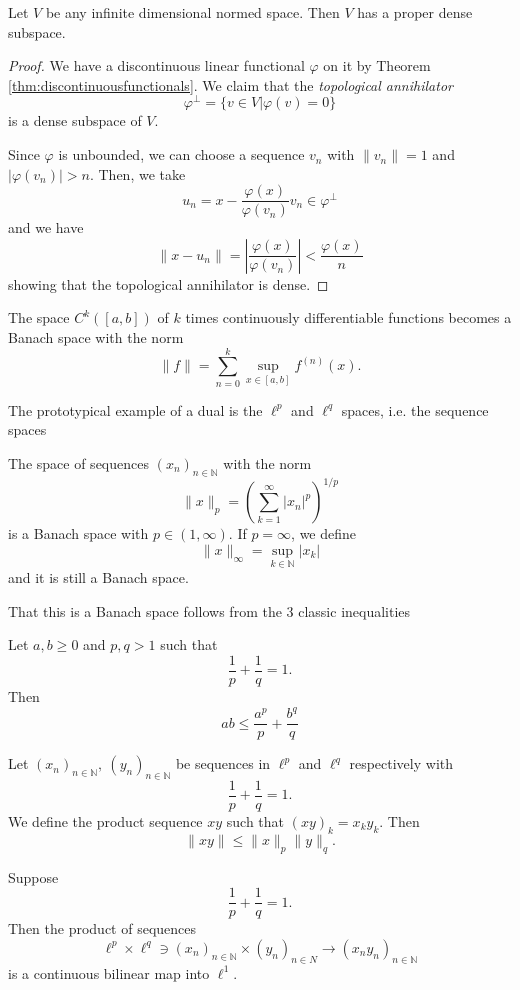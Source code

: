 \documentclass[twoside,symmetric, openany, 12pt]{./tuftebook}
\theoremstyle{definition}
\theoremstyle{definition}
\theoremstyle{definition}
\newcommand{\N}{\mathbb{N}}
\begin{document}
\begin{Example}
	Let $V$ be any infinite dimensional normed space. Then $V$ has a proper dense subspace.
\end{Example}
\begin{proof}
	We have a discontinuous linear functional $\varphi$ on it by Theorem \ref{thm:discontinuousfunctionals}. We claim that the \emph{topological annihilator}
	\[\varphi^\perp = \{v\in V|\varphi(v) = 0\}\]
	is a dense subspace of $V$.
	
	Since $\varphi$ is unbounded, we can choose a sequence $v_n$ with $\|v_n\| = 1$ and $|\varphi(v_n)| > n$. Then, we take
	\[u_n = x - \frac{\varphi(x)}{\varphi(v_n)}v_n\in \varphi^\perp\]
	and we have
	\[\|x - u_n\| = \left|\frac{\varphi(x)}{\varphi(v_n)}\right|< \frac{\varphi(x)}{n}\]
	showing that the topological annihilator is dense.
\end{proof}
\begin{Example}
	The space $C^k([a,b])$ of $k$ times continuously differentiable functions becomes a Banach space with the norm
	\[\|f\| = \sum_{n=0}^k \sup_{x\in [a,b]} f^{(n)}(x).\]
\end{Example}
The prototypical example of a dual is the $\ell^p$ and $\ell^q$ spaces, i.e. the sequence spaces
\begin{Definition}[$\ell^p$]
	The space of sequences $(x_n)_{n\in \N}$ with the norm
	\[\|x\|_p = \left(\sum_{k=1}^\infty |x_n|^p\right)^{1/p}\]
	is a Banach space with $p\in (1,\infty)$. If $p=\infty$, we define
	\[\|x\|_\infty = \sup_{k\in \N} |x_k|\]
	and it is still a Banach space.
\end{Definition}
That this is a Banach space follows from the 3 classic inequalities
\begin{Theorem}
	Let $a,b\ge 0$ and $p,q>1$ such that
	\[\frac 1p + \frac 1q = 1.\]
	Then
	\[ab \le \frac{a^p}{p}+ \frac{b^q}{q}\]
\end{Theorem}
\begin{Theorem}
	Let $(x_n)_{n\in \N},~(y_n)_{n\in \N}$ be sequences in $\ell^p$ and $\ell^q$ respectively with
	\[\frac 1p + \frac 1q = 1.\]
	We define the product sequence $xy$ such that $(xy)_k = x_k y_k$. Then
	\[\|xy\| \le \|x\|_p \|y\|_q.\]
\end{Theorem}
\begin{Corollary}\label{cor:productwelldef}
	Suppose
	\[\frac 1p + \frac 1q = 1.\]
	Then the product of sequences
	\[\ell^p \times \ell^q\ni (x_n)_{n\in \N}\times (y_n)_{n\in N} \to (x_ny_n)_{n\in \N}\]
	is a continuous bilinear map into $\ell^1$.
\end{Corollary}
\end{document}

